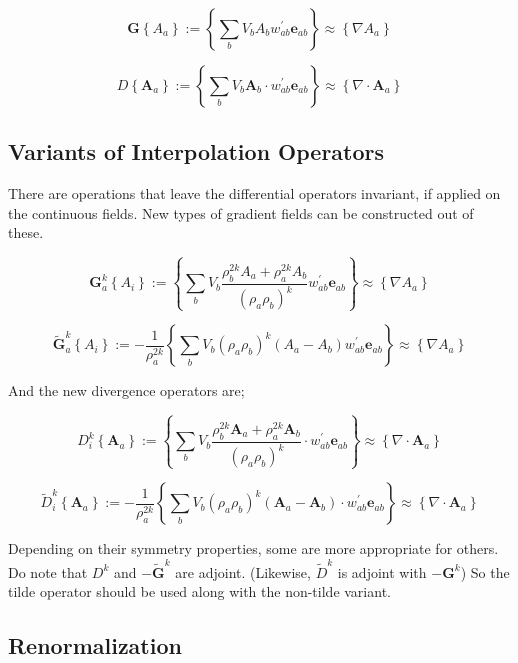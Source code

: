 \documentclass[12pt]{article}
\begin{document}
\[
    \mathbf{G} \left\{ A_a \right\} := \left\{
        \sum\limits_{b} V_b A_b w^{'}_{ab} \mathbf{e}_{ab}
    \right\} \approx
    \left\{ \nabla A_a \right\}
\]

\[
    D \left\{ \mathbf{A}_a \right\} := \left\{
        \sum\limits_{b} V_b \mathbf{A}_b \cdot w^{'}_{ab} \mathbf{e}_{ab}
    \right\} \approx
    \left\{ \nabla \cdot \mathbf{A}_a \right\}
\]

\subsection{Variants of Interpolation Operators}

There are operations that leave the differential operators invariant,
if applied on the continuous fields.
New types of gradient fields can be constructed out of these.

\[
    \mathbf{G}^k_a \left\{ A_i \right\} := \left\{
        \sum\limits_{b} V_b
        \frac{\rho_b^{2k}A_a+\rho_a^{2k}A_b}{{\left(\rho_a\rho_b\right)}^k}
        w^{'}_{ab} \mathbf{e}_{ab}
    \right\} \approx
    \left\{ \nabla A_a \right\}
\]

\[
    \widetilde{\mathbf{G}}^k_a \left\{A_i\right\} := -\frac{1}{\rho_a^{2k}}\left\{
        \sum\limits_{b} V_b {\left( \rho_a \rho_b \right)}^{k}
        \left( A_a - A_b \right) w^{'}_{ab} \mathbf{e}_{ab}
    \right\} \approx
    \left\{ \nabla A_a \right\}
\]

And the new divergence operators are;

\[
    D^k_i \left\{ \mathbf{A}_a \right\} := \left\{
        \sum\limits_{b} V_b
        \frac{\rho_b^{2k}\mathbf{A}_a+\rho_a^{2k}\mathbf{A}_b}{{\left(\rho_a\rho_b\right)}^k}
        \cdot w^{'}_{ab} \mathbf{e}_{ab}
    \right\} \approx
    \left\{ \nabla \cdot \mathbf{A}_a \right\}
\]

\[
    \widetilde{D}^k_i \left\{ \mathbf{A}_a \right\} := -\frac{1}{\rho_a^{2k}}\left\{
        \sum\limits_{b} V_b {\left( \rho_a \rho_b \right)}^{k}
        \left(\mathbf{A}_a-\mathbf{A}_b\right)
        \cdot w^{'}_{ab} \mathbf{e}_{ab}
    \right\} \approx
    \left\{ \nabla \cdot \mathbf{A}_a \right\}
\]

Depending on their symmetry properties, some are more appropriate for others.
Do note that $D^k$ and $-\widetilde{\mathbf{G}}^k$ are adjoint.
(Likewise, $\widetilde{D}^k$ is adjoint with $-\mathbf{G}^k$)
So the tilde operator should be used along with the non-tilde variant.

\subsection{Renormalization}
\end{document}
